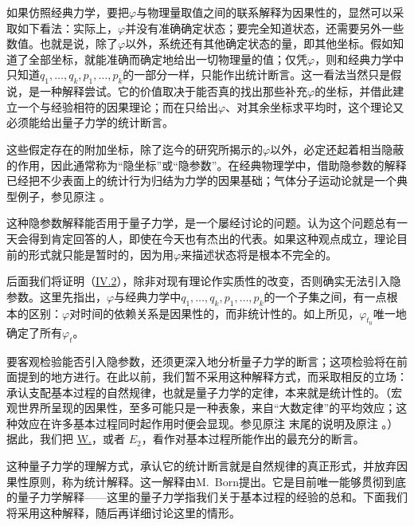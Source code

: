 \documentclass[fontsize=13pt,twoside,openany,headings=normal,parskip=false,bookmarkpackage=false,DIV=calc]{scrbook}
\begin{document}
如果仿照经典力学，要把$\varphi$与物理量取值之间的联系解释为因果性的，显然可以采取如下看法：实际上，$\varphi$并没有准确确定状态；要完全知道状态，还需要另外一些数值。也就是说，除了$\varphi$以外，系统还有其他确定状态的量，即其他坐标。假如知道了全部坐标，就能准确而确定地给出一切物理量的值；仅凭$\varphi$，则和经典力学中只知道$q_1,\allowbreak \ldots,\allowbreak q_k,\allowbreak p_1,\allowbreak \ldots,\allowbreak p_k$的一部分一样，只能作出统计断言。这一看法当然只是假说，是一种解释尝试。它的价值取决于能否真的找出那些补充$\varphi$的坐标，并借此建立一个与经验相符的因果理论；\hypertarget{origpage-109}{}\label{origpage-109}而在只给出$\varphi$、对其余坐标求平均时，这个理论又必须能给出量子力学的统计断言。

这些假定存在的附加坐标，除了迄今的研究所揭示的$\varphi$以外，必定还起着相当隐蔽的作用，因此通常称为“隐坐标”或“隐参数”。在经典物理学中，借助隐参数的解释已经把不少表面上的统计行为归结为力学的因果基础；气体分子运动论就是一个典型例子，参见原注 \hyperlink{note-120}{}。

这种隐参数解释能否用于量子力学，是一个屡经讨论的问题。认为这个问题总有一天会得到肯定回答的人，即使在今天也有杰出的代表。如果这种观点成立，理论目前的形式就只能是暂时的，因为用$\varphi$来描述状态将是根本不完全的。

后面我们将证明（\hyperref[sec:IV.2]{IV.2}），除非对现有理论作实质性的改变，否则确实无法引入隐参数。这里先指出，$\varphi$与经典力学中$q_1,\allowbreak \ldots,\allowbreak q_k,\allowbreak p_1,\allowbreak \ldots,\allowbreak p_k$的一个子集之间，有一点根本的区别：$\varphi$对时间的依赖关系是因果性的，而非统计性的。如上所见，$\varphi_{t_0}$唯一地确定了所有$\varphi_t$。

要客观检验能否引入隐参数，还须更深入地分析量子力学的断言；这项检验将在前面提到的地方进行。在此以前，我们暂不采用这种解释方式，而采取相反的立场：承认支配基本过程的自然规律，也就是量子力学的定律，本来就是统计性的。（宏观世界所呈现的因果性，至多可能只是一种表象，来自“大数定律”的平均效应；这种效应在许多基本过程同时起作用时便会显现。参见原注 \hyperlink{note-120}{} 末尾的说明及原注 \hyperlink{note-175}{}。）据此，我们把 \hyperref[post:III.1.W]{W.}，或者 \hyperref[post:III.1.E2]{$E_2$}，看作对基本过程所能作出的最充分的断言。

这种量子力学的理解方式，承认它的统计断言就是自然规律的真正形式，并放弃因果性原则，称为统计解释。这一解释由M.~Born提出。它是目前唯一能够贯彻到底的量子力学解释——这里的量子力学指我们关于基本过程的经验的总和。下面我们将采用这种解释，随后再详细讨论这里的情形。
\end{document}
